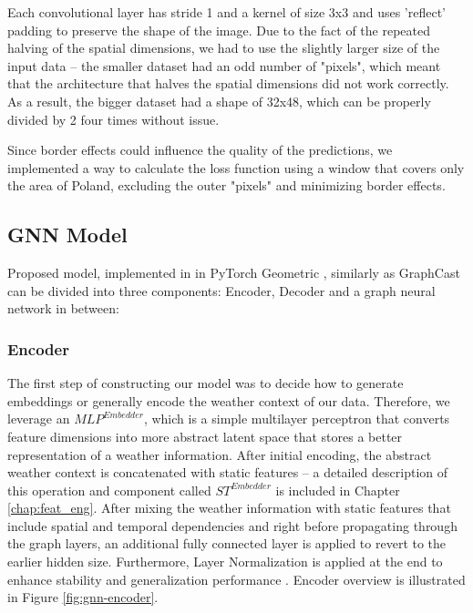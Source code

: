 Each convolutional layer has stride 1 and a kernel of size 3x3 and uses 'reflect' padding to preserve the shape of the image. Due to the fact of the repeated halving of the spatial dimensions, we had to use the slightly larger size of the input data -- the smaller dataset had an odd number of "pixels", which meant that the architecture that halves the spatial dimensions did not work correctly. As a result, the bigger dataset had a shape of 32x48, which can be properly divided by 2 four times without issue.

Since border effects could influence the quality of the predictions, we implemented a way to calculate the loss function using a window that covers only the area of Poland, excluding the outer "pixels" and minimizing border effects.

\subsection{GNN Model}\label{chap:model}
Proposed model, implemented in in PyTorch Geometric \cite{fey2019fast}, similarly as GraphCast can be divided into three components: Encoder, Decoder and a graph neural network in between:



\subsubsection{Encoder}
The first step of constructing our model was to decide how to generate embeddings or generally encode the weather context of our data. Therefore, we leverage an $MLP^{Embedder}$, which is a simple multilayer perceptron that converts feature dimensions into more abstract latent space that stores a better representation of a weather information. After initial encoding, the abstract weather context is concatenated with static features -- a detailed description of this operation and component called $ST^{Embedder}$ is included in Chapter \ref{chap:feat_eng}. After mixing the weather information with static features that include spatial and temporal dependencies and right before propagating through the graph layers, an additional fully connected layer is applied to revert to the earlier hidden size. Furthermore, Layer Normalization is applied at the end to enhance stability and generalization performance \cite{ba2016layer}. Encoder overview is illustrated in Figure \ref{fig:gnn-encoder}.



